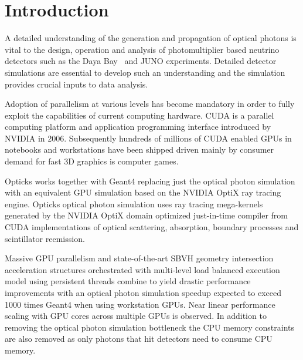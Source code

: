 \documentclass[a4paper]{jpconf}
\begin{document}
\section{Introduction}

A detailed understanding of the generation and propagation of optical 
photons is vital to the design, operation and analysis of photomultiplier
based neutrino detectors such as the Daya Bay~\cite{dyb} and JUNO\cite{juno} experiments. 
Detailed detector simulations are essential to develop such an understanding and the 
simulation provides crucial inputs to data analysis.  






Adoption of parallelism at various levels has become mandatory in order to 
fully exploit the capabilities of current computing hardware.  
CUDA is a parallel computing platform and application programming interface  
introduced by NVIDIA in 2006. Subsequently hundreds of millions of CUDA enabled GPUs 
in notebooks and workstations have been shipped driven mainly by consumer demand for
fast 3D graphics is computer games. 



Opticks works together with Geant4 replacing just the optical photon simulation with
an equivalent GPU simulation based on the NVIDIA OptiX ray tracing engine.
Opticks optical photon simulation uses ray tracing mega-kernels generated 
by the NVIDIA OptiX domain optimized just-in-time compiler from CUDA implementations
of optical scattering, absorption, boundary processes and scintillator reemission.

Massive GPU parallelism and state-of-the-art SBVH\cite{sbvh} geometry intersection acceleration structures
orchestrated with multi-level load balanced execution model using persistent threads 
combine to yield drastic performance improvements with an optical photon simulation speedup 
expected to exceed 1000 times Geant4 when using workstation GPUs. 
Near linear performance scaling with GPU cores across multiple GPUs is observed. 
In addition to removing the optical photon simulation bottleneck the CPU memory 
constraints are also removed as only photons that hit detectors need to 
consume CPU memory.
\end{document}

